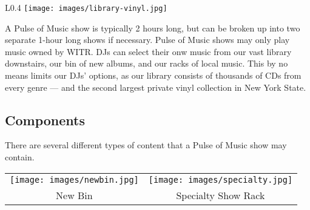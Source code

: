 \documentclass{witrman}
\begin{document}
\begin{wrapfigure}{L}{0.4\linewidth}
    \centering
    \texttt{[image: images/library-vinyl.jpg]}
\end{wrapfigure}

A Pulse of Music show is typically 2 hours long, but can be broken up into two
separate 1-hour long shows if necessary.  Pulse of Music shows may only play
music owned by WITR\@.  DJs can select their onw music from our vast library
downstairs, our bin of new albums, and our racks of local music.  This by no
means limits our DJs' options, as our library consists of thousands of CDs from
every genre --- and the second largest private vinyl collection in
New York State.

\subsection{Components}

There are several different types of content that a Pulse of Music show may
contain.
\begin{itemize}
\end{itemize}

\begin{tabular}{cc}
    \texttt{[image: images/newbin.jpg]} &
    \texttt{[image: images/specialty.jpg]} \\

    New Bin &
    Specialty Show Rack \\
\end{tabular}
\end{document}
